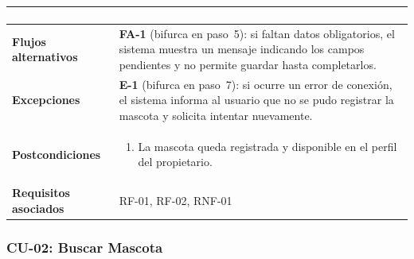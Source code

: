 \documentclass[journal,onecolumn]{IEEEtran}
\begin{document}
\begin{table}[H]
\begin{tabularx}{\textwidth}{|l|X|}
\begin{enumerate}[leftmargin=*,topsep=0pt]
                               \end{enumerate} \\
\hline
\textbf{Flujos alternativos} & \textbf{FA-1} (bifurca en paso~5): si faltan datos obligatorios, el sistema muestra un mensaje indicando los campos pendientes y no permite guardar hasta completarlos. \\
\hline
\textbf{Excepciones}         & \textbf{E-1} (bifurca en paso~7): si ocurre un error de conexión, el sistema informa al usuario que no se pudo registrar la mascota y solicita intentar nuevamente. \\
\hline
\textbf{Postcondiciones}     & \begin{enumerate}[leftmargin=*,topsep=0pt]
                                 \item La mascota queda registrada y disponible en el perfil del propietario.
                               \end{enumerate} \\
\hline
\textbf{Requisitos asociados} & RF-01, RF-02, RNF-01 \\
\hline
\end{tabularx}
\end{table}

\subsubsection{CU-02: Buscar Mascota}
\end{document}
